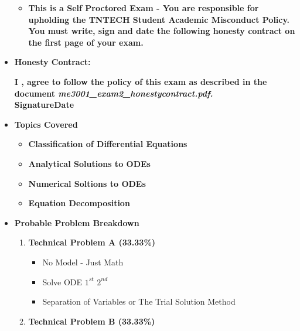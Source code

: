 \documentclass[11pt]{article}
\begin{document}
\begin{itemize}
\begin{itemize}
		\item \textbf{ This is a Self Proctored Exam - You are responsible for upholding the TNTECH Student Academic Misconduct Policy. You must write, sign and date the following honesty contract on the first page of your exam. }\\
\end{itemize}
\large 
		\item \textbf{Honesty Contract:}
\begin{framed}
		 \textbf{I \underline{\hspace{50mm}}, agree to follow the policy of this exam as described in the document {\it me3001\_exam2\_honestycontract.pdf. }}\vspace{3mm}\\
		 \textbf{Signature\underline{\hspace{80mm}}\hspace{10mm}Date\underline{\hspace{20mm}}}\\
\end{framed}
	
\newpage
\item  \textbf{\Large Topics Covered}\\
	\begin{itemize}

		\item  \textbf{\large Classification of Differential Equations}\vspace{0mm}\\
		\item  \textbf{\large Analytical Solutions to ODEs}\vspace{0mm}\\
		\item  \textbf{\large Numerical Soltions to ODEs}\vspace{0mm}\\
		\item  \textbf{\large Equation Decomposition}\\


	\end{itemize}

\item  \textbf{\Large Probable Problem Breakdown}\\
\Large
	\begin{enumerate}


		\item  \textbf{\Large Technical Problem A (33.33\%)}\\
		\begin{itemize}
			\item No Model - Just Math
			\item Solve ODE $1^{st}$\hspace{3mm} $2^{nd}$
			\item Separation of Variables or The Trial Solution Method\\
		\end{itemize}
		\item  \textbf{\Large Technical Problem B (33.33\%)}\\
		\begin{itemize}
		

\end{itemize}
\end{enumerate}
\end{itemize}
\end{document}

